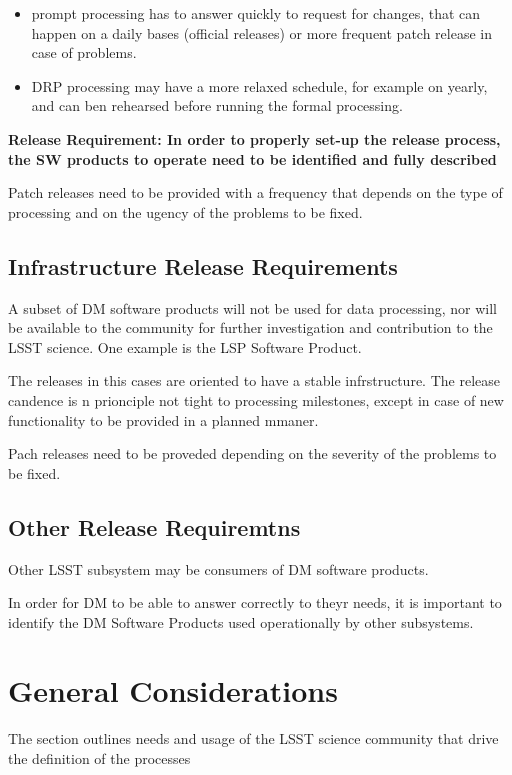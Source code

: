 \begin{itemize}
\item prompt processing has to answer quickly to request for changes, that can happen on a daily bases (official releases)
 or more frequent patch release in case of problems.
\item DRP processing may have a more relaxed schedule, for example on yearly, and can ben rehearsed before running the formal processing.
\end{itemize}

\textbf{Release Requirement: In order to properly set-up the release process, 
the SW products to operate need to be identified and fully described}

Patch releases need to be provided with a frequency that depends on the type of processing
and on the ugency of the problems to be fixed.


\subsection{Infrastructure Release Requirements} \label{sec:infreqs}

A subset of DM software products will not be used for data processing,
nor will be available to the community for further investigation and contribution to the LSST science.
One example is the LSP Software Product.

The releases in this cases are oriented to have a stable infrstructure.
The release candence is n prionciple not tight to processing milestones,
except in case of new functionality to be provided in a planned mmaner.

Pach releases need to be proveded depending on the severity of the problems to be fixed.


\subsection{Other Release Requiremtns} \label{other:reqs}

Other LSST subsystem may be consumers of DM software products.

In order for DM to be able to answer correctly to theyr needs, 
it is important to identify the DM Software Products used operationally by other subsystems.

\newpage
\section{General Considerations} \label{sec:considerations}

The section outlines needs and usage of the LSST science community that drive the definition of the processes 
